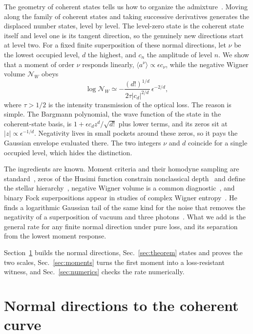 \documentclass[11pt,a4paper]{article}
\newcommand{\ev}[1]{\langle#1\rangle}
\newcommand{\NW}{\mathcal N_W}
\begin{document}
The geometry of coherent states tells us how to organize the admixture~\cite{field1999geometry,brody2010coherent}. Moving along the family of coherent states and taking successive derivatives generates the displaced number states, level by level. The level-zero state is the coherent state itself and level one is its tangent direction, so the genuinely new directions start at level two. For a fixed finite superposition of these normal directions, let $\nu$ be the lowest occupied level, $d$ the highest, and $c_n$ the amplitude of level $n$. We show that a moment of order $\nu$ responds linearly, $\ev{a^\nu}\propto\epsilon c_\nu$, while the negative Wigner volume $\NW$ obeys
\begin{equation*}
 \log\NW\simeq-\frac{(d!)^{1/d}}{2\tau|c_d|^{2/d}}\,\epsilon^{-2/d},
\end{equation*}
where $\tau>1/2$ is the intensity transmission of the optical loss. The reason is simple. The Bargmann polynomial, the wave function of the state in the coherent-state basis, is $1+\epsilon c_dz^d/\sqrt{d!}$ plus lower terms, and its zeros sit at $|z|\propto\epsilon^{-1/d}$. Negativity lives in small pockets around these zeros, so it pays the Gaussian envelope evaluated there. The two integers $\nu$ and $d$ coincide for a single occupied level, which hides the distinction.

The ingredients are known. Moment criteria and their homodyne sampling are standard~\cite{shchukin2005nonclassical,richter1996correlation}, zeros of the Husimi function constrain nonclassical depth~\cite{lutkenhaus1995} and define the stellar hierarchy~\cite{chabaud2020stellar}, negative Wigner volume is a common diagnostic~\cite{kenfack2004negativity}, and binary Fock superpositions appear in studies of complex Wigner entropy~\cite{cerf2024}. He finds a logarithmic Gaussian tail of the same kind for the noise that removes the negativity of a superposition of vacuum and three photons~\cite{he2026}. What we add is the general rate for any finite normal direction under pure loss, and its separation from the lowest moment response.

Section~\ref{sec:normal} builds the normal directions, Sec.~\ref{sec:theorem} states and proves the two scales, Sec.~\ref{sec:moments} turns the first moment into a loss-resistant witness, and Sec.~\ref{sec:numerics} checks the rate numerically.

\section{Normal directions to the coherent curve}
\label{sec:normal}
\end{document}
